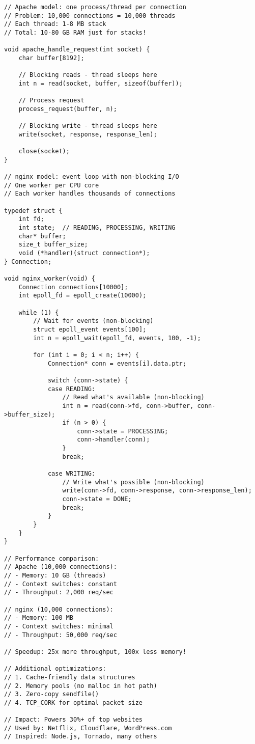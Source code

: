 \begin{lstlisting}
// Apache model: one process/thread per connection
// Problem: 10,000 connections = 10,000 threads
// Each thread: 1-8 MB stack
// Total: 10-80 GB RAM just for stacks!

void apache_handle_request(int socket) {
    char buffer[8192];

    // Blocking reads - thread sleeps here
    int n = read(socket, buffer, sizeof(buffer));

    // Process request
    process_request(buffer, n);

    // Blocking write - thread sleeps here
    write(socket, response, response_len);

    close(socket);
}

// nginx model: event loop with non-blocking I/O
// One worker per CPU core
// Each worker handles thousands of connections

typedef struct {
    int fd;
    int state;  // READING, PROCESSING, WRITING
    char* buffer;
    size_t buffer_size;
    void (*handler)(struct connection*);
} Connection;

void nginx_worker(void) {
    Connection connections[10000];
    int epoll_fd = epoll_create(10000);

    while (1) {
        // Wait for events (non-blocking)
        struct epoll_event events[100];
        int n = epoll_wait(epoll_fd, events, 100, -1);

        for (int i = 0; i < n; i++) {
            Connection* conn = events[i].data.ptr;

            switch (conn->state) {
            case READING:
                // Read what's available (non-blocking)
                int n = read(conn->fd, conn->buffer, conn->buffer_size);
                if (n > 0) {
                    conn->state = PROCESSING;
                    conn->handler(conn);
                }
                break;

            case WRITING:
                // Write what's possible (non-blocking)
                write(conn->fd, conn->response, conn->response_len);
                conn->state = DONE;
                break;
            }
        }
    }
}

// Performance comparison:
// Apache (10,000 connections):
// - Memory: 10 GB (threads)
// - Context switches: constant
// - Throughput: 2,000 req/sec

// nginx (10,000 connections):
// - Memory: 100 MB
// - Context switches: minimal
// - Throughput: 50,000 req/sec

// Speedup: 25x more throughput, 100x less memory!

// Additional optimizations:
// 1. Cache-friendly data structures
// 2. Memory pools (no malloc in hot path)
// 3. Zero-copy sendfile()
// 4. TCP_CORK for optimal packet size

// Impact: Powers 30%+ of top websites
// Used by: Netflix, Cloudflare, WordPress.com
// Inspired: Node.js, Tornado, many others
\end{lstlisting}

